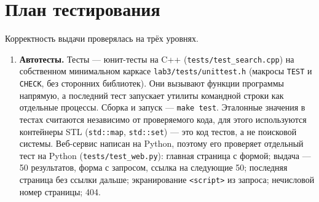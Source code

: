 \section{План тестирования}
Корректность выдачи проверялась на трёх уровнях.
\begin{enumerate}
    \item \textbf{Автотесты.} Тесты --- юнит-тесты на C++ (\texttt{tests/test\_search.cpp}) на собственном минимальном каркасе \texttt{lab3/tests/unittest.h} (макросы \texttt{TEST} и \texttt{CHECK}, без сторонних библиотек). Они вызывают функции программы напрямую, а последний тест запускает утилиты командной строки как отдельные процессы. Сборка и запуск --- \texttt{make test}. Эталонные значения в тестах считаются независимо от проверяемого кода, для этого используются контейнеры STL (\texttt{std::map}, \texttt{std::set}) --- это код тестов, а не поисковой системы. Веб-сервис написан на Python, поэтому его проверяет отдельный тест на Python (\texttt{tests/test\_web.py}): главная страница с формой; выдача --- 50 результатов, форма с запросом, ссылка на следующие 50; последняя страница без ссылки дальше; экранирование \texttt{<script>} из запроса; нечисловой номер страницы; 404.
\end{enumerate}


